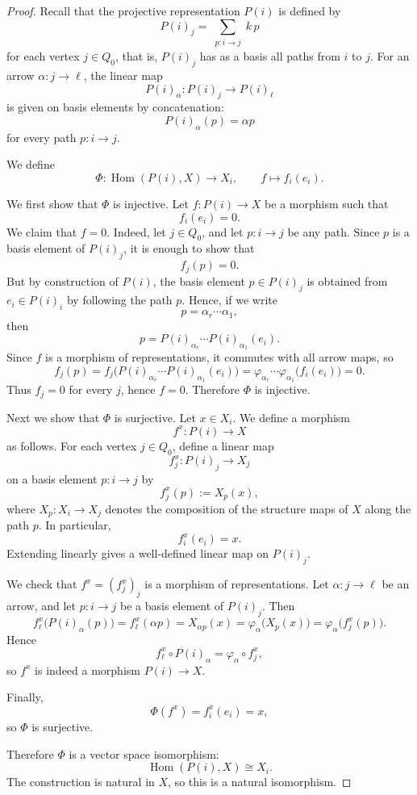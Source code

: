 \documentclass[11pt, a4paper]{report}
\begin{document}
\begin{proof}
    Recall that the projective representation $P(i)$ is defined by
    \[
        P(i)_j=\sum_{\substack{p:i\to j}} k\,p
    \]
    for each vertex $j\in Q_0$, that is, $P(i)_j$ has as a basis all paths from $i$ to $j$. For an arrow $\alpha:j\to \ell$, the linear map
    \[
        P(i)_\alpha:P(i)_j\to P(i)_\ell
    \]
    is given on basis elements by concatenation:
    \[
        P(i)_\alpha(p)=\alpha p
    \]
    for every path $p:i\to j$.

    We define
    \[
        \Phi:\operatorname{Hom}(P(i),X)\to X_i,\qquad f\mapsto f_i(e_i).
    \]

    We first show that $\Phi$ is injective. Let $f:P(i)\to X$ be a morphism such that
    \[
        f_i(e_i)=0.
    \]
    We claim that $f=0$. Indeed, let $j\in Q_0$, and let $p:i\to j$ be any path. Since $p$ is a basis element of $P(i)_j$, it is enough to show that
    \[
        f_j(p)=0.
    \]
    But by construction of $P(i)$, the basis element $p\in P(i)_j$ is obtained from $e_i\in P(i)_i$ by following the path $p$. Hence, if we write
    \[
        p=\alpha_r\cdots \alpha_1,
    \]
    then
    \[
        p=P(i)_{\alpha_r}\cdots P(i)_{\alpha_1}(e_i).
    \]
    Since $f$ is a morphism of representations, it commutes with all arrow maps, so
    \[
        f_j(p)
        =
        f_j\bigl(P(i)_{\alpha_r}\cdots P(i)_{\alpha_1}(e_i)\bigr)
        =
        \varphi_{\alpha_r}\cdots \varphi_{\alpha_1}\bigl(f_i(e_i)\bigr)
        =
        0.
    \]
    Thus $f_j=0$ for every $j$, hence $f=0$. Therefore $\Phi$ is injective.

    Next we show that $\Phi$ is surjective. Let $x\in X_i$. We define a morphism
    \[
        f^x:P(i)\to X
    \]
    as follows. For each vertex $j\in Q_0$, define a linear map
    \[
        f^x_j:P(i)_j\to X_j
    \]
    on a basis element $p:i\to j$ by
    \[
        f^x_j(p):=X_p(x),
    \]
    where $X_p:X_i\to X_j$ denotes the composition of the structure maps of $X$ along the path $p$. In particular,
    \[
        f^x_i(e_i)=x.
    \]
    Extending linearly gives a well-defined linear map on $P(i)_j$.

    We check that $f^x=(f^x_j)_j$ is a morphism of representations. Let $\alpha:j\to \ell$ be an arrow, and let $p:i\to j$ be a basis element of $P(i)_j$. Then
    \[
        f^x_\ell\bigl(P(i)_\alpha(p)\bigr)
        =
        f^x_\ell(\alpha p)
        =
        X_{\alpha p}(x)
        =
        \varphi_\alpha\bigl(X_p(x)\bigr)
        =
        \varphi_\alpha\bigl(f^x_j(p)\bigr).
    \]
    Hence
    \[
        f^x_\ell\circ P(i)_\alpha=\varphi_\alpha\circ f^x_j,
    \]
    so $f^x$ is indeed a morphism $P(i)\to X$.

    Finally,
    \[
        \Phi(f^x)=f^x_i(e_i)=x,
    \]
    so $\Phi$ is surjective.

    Therefore $\Phi$ is a vector space isomorphism:
    \[
        \operatorname{Hom}(P(i),X)\cong X_i.
    \]
    The construction is natural in $X$, so this is a natural isomorphism.
\end{proof}
\end{document}
